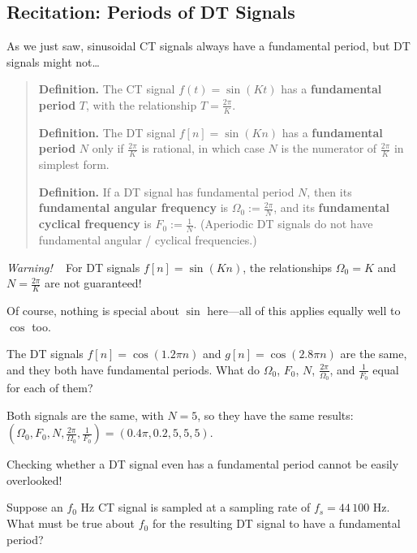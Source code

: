 \subsection{Recitation: Periods of DT Signals}

As we just saw, sinusoidal CT signals always have a fundamental period,
but DT signals might not\dots

\begin{quote}
    \textbf{Definition.}
    The CT signal $f(t) = \sin(Kt)$ has a \textbf{fundamental period} $T$,
    with the relationship $T = \frac{2\pi}{K}$.

    \textbf{Definition.}
    The DT signal $f[n] = \sin(Kn)$ has a \textbf{fundamental period} $N$
    only if $\frac{2\pi}{K}$ is rational,
    in which case $N$ is the numerator of $\frac{2\pi}{K}$ in simplest form.

    \textbf{Definition.}
    If a DT signal has fundamental period $N$,
    then its \textbf{fundamental angular frequency} is $\Omega_0 := \frac{2\pi}{N}$,
    and its \textbf{fundamental cyclical frequency} is $F_0 := \frac{1}{N}$.
    (Aperiodic DT signals do not have fundamental angular / cyclical frequencies.)
\end{quote}

\textcolor{red!75}{\emph{Warning!}} ~
For DT signals $f[n] = \sin(Kn)$, the relationships $\Omega_0 = K$ and
$N = \frac{2\pi}{K}$ are not guaranteed!

\begin{remark}
    Of course, nothing is special about $\sin$ here---all of this
    applies equally well to $\cos$ too.
\end{remark}

\begin{problem}
    The DT signals $f[n] = \cos(1.2\pi n)$ and $g[n] = \cos(2.8\pi n)$ are the same,
    and they both have fundamental periods.
    What do $\Omega_0$, $F_0$, $N$, $\frac{2\pi}{\Omega_0}$, and $\frac{1}{F_0}$
    equal for each of them?
\end{problem}

\begin{solution}
    Both signals are the same, with $N = 5$, so they have the same results:
    $(\Omega_0, F_0, N, \frac{2\pi}{\Omega_0}, \frac{1}{F_0}) =
    (0.4\pi, 0.2, 5, 5, 5)$.
\end{solution}

Checking whether a DT signal even has a fundamental period
cannot be easily overlooked!

\begin{problem}
    Suppose an $f_0$ Hz CT signal is sampled at a sampling rate of $f_s = 44 \, 100$ Hz.
    What must be true about $f_0$ for the resulting DT signal to have a fundamental period?
\end{problem}

